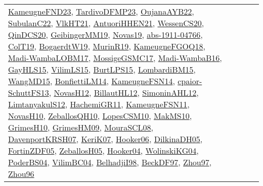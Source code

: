 {\begin{longtable}{lp{3cm}>{\raggedright}p{6cm}>{\raggedright}p{6cm}p{8cm}}
\href{papers/KameugneFND23.pdf}{KameugneFND23}\cite{KameugneFND23}, \href{papers/TardivoDFMP23.pdf}{TardivoDFMP23}\cite{TardivoDFMP23}, \href{papers/OujanaAYB22.pdf}{OujanaAYB22}\cite{OujanaAYB22}, \href{articles/SubulanC22.pdf}{SubulanC22}\cite{SubulanC22}, \href{articles/VlkHT21.pdf}{VlkHT21}\cite{VlkHT21}, \href{papers/AntuoriHHEN21.pdf}{AntuoriHHEN21}\cite{AntuoriHHEN21}, \href{papers/WessenCS20.pdf}{WessenCS20}\cite{WessenCS20}, \href{articles/QinDCS20.pdf}{QinDCS20}\cite{QinDCS20}, \href{papers/GeibingerMM19.pdf}{GeibingerMM19}\cite{GeibingerMM19}, \href{articles/Novas19.pdf}{Novas19}\cite{Novas19}, \href{articles/abs-1911-04766.pdf}{abs-1911-04766}\cite{abs-1911-04766}, \href{papers/ColT19.pdf}{ColT19}\cite{ColT19}, \href{papers/BogaerdtW19.pdf}{BogaerdtW19}\cite{BogaerdtW19}, \href{papers/MurinR19.pdf}{MurinR19}\cite{MurinR19}, \href{papers/KameugneFGOQ18.pdf}{KameugneFGOQ18}\cite{KameugneFGOQ18}, \href{papers/Madi-WambaLOBM17.pdf}{Madi-WambaLOBM17}\cite{Madi-WambaLOBM17}, \href{papers/MossigeGSMC17.pdf}{MossigeGSMC17}\cite{MossigeGSMC17}, \href{papers/Madi-WambaB16.pdf}{Madi-WambaB16}\cite{Madi-WambaB16}, \href{papers/GayHLS15.pdf}{GayHLS15}\cite{GayHLS15}, \href{papers/VilimLS15.pdf}{VilimLS15}\cite{VilimLS15}, \href{papers/BurtLPS15.pdf}{BurtLPS15}\cite{BurtLPS15}, \href{papers/LombardiBM15.pdf}{LombardiBM15}\cite{LombardiBM15}, \href{articles/WangMD15.pdf}{WangMD15}\cite{WangMD15}, \href{papers/BonfiettiLM14.pdf}{BonfiettiLM14}\cite{BonfiettiLM14}, \href{articles/KameugneFSN14.pdf}{KameugneFSN14}\cite{KameugneFSN14}, \href{papers/cpaior-SchuttFS13.pdf}{cpaior-SchuttFS13}\cite{cpaior-SchuttFS13}, \href{articles/NovasH12.pdf}{NovasH12}\cite{NovasH12}, \href{papers/BillautHL12.pdf}{BillautHL12}\cite{BillautHL12}, \href{papers/SimoninAHL12.pdf}{SimoninAHL12}\cite{SimoninAHL12}, \href{articles/LimtanyakulS12.pdf}{LimtanyakulS12}\cite{LimtanyakulS12}, \href{articles/HachemiGR11.pdf}{HachemiGR11}\cite{HachemiGR11}, \href{papers/KameugneFSN11.pdf}{KameugneFSN11}\cite{KameugneFSN11}, \href{articles/NovasH10.pdf}{NovasH10}\cite{NovasH10}, \href{articles/ZeballosQH10.pdf}{ZeballosQH10}\cite{ZeballosQH10}, \href{articles/LopesCSM10.pdf}{LopesCSM10}\cite{LopesCSM10}, \href{papers/MakMS10.pdf}{MakMS10}\cite{MakMS10}, \href{papers/GrimesH10.pdf}{GrimesH10}\cite{GrimesH10}, \href{papers/GrimesHM09.pdf}{GrimesHM09}\cite{GrimesHM09}, \href{papers/MouraSCL08.pdf}{MouraSCL08}\cite{MouraSCL08}, \href{papers/DavenportKRSH07.pdf}{DavenportKRSH07}\cite{DavenportKRSH07}, \href{papers/KeriK07.pdf}{KeriK07}\cite{KeriK07}, \href{articles/Hooker06.pdf}{Hooker06}\cite{Hooker06}, \href{papers/DilkinaDH05.pdf}{DilkinaDH05}\cite{DilkinaDH05}, \href{papers/FortinZDF05.pdf}{FortinZDF05}\cite{FortinZDF05}, \href{articles/ZeballosH05.pdf}{ZeballosH05}\cite{ZeballosH05}, \href{papers/Hooker04.pdf}{Hooker04}\cite{Hooker04}, \href{papers/WolinskiKG04.pdf}{WolinskiKG04}\cite{WolinskiKG04}, \href{articles/PoderBS04.pdf}{PoderBS04}\cite{PoderBS04}, \href{papers/VilimBC04.pdf}{VilimBC04}\cite{VilimBC04}, \href{articles/BelhadjiI98.pdf}{BelhadjiI98}\cite{BelhadjiI98}, \href{papers/BeckDF97.pdf}{BeckDF97}\cite{BeckDF97}, \href{articles/Zhou97.pdf}{Zhou97}\cite{Zhou97}, \href{papers/Zhou96.pdf}{Zhou96}\cite{Zhou96} & 
\end{longtable}}
